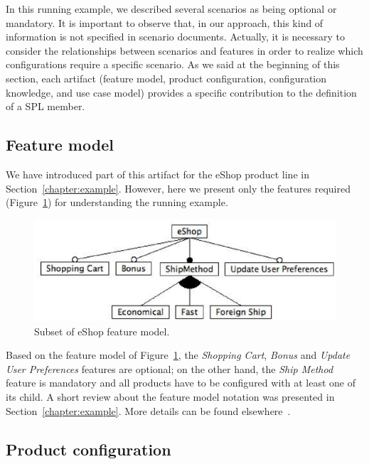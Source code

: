 \documentclass[11pt]{report}
\begin{document}
In this running example, we described several scenarios as being optional or
mandatory. It is important to observe that, in our approach, this kind of
information is not specified in scenario documents. Actually, it is necessary to
consider the relationships between scenarios and features in order to realize
which configurations require a specific scenario. As we said at the beginning of
this section, each artifact (feature model, product configuration, configuration
knowledge, and use case model) provides a specific contribution to the definition
of a SPL member.

\subsection{Feature model}\label{subsub:fm}

We have introduced part of this artifact for the eShop product line in
Section~\ref{chapter:example}. However, here we present only the features required 
(Figure~\ref{fig:eshop-fm-re}) for understanding the running example.

 \begin{figure}[h]
 \begin{center}
  \includegraphics[scale=0.40]{img/eShop-fm-re.eps}
    \caption{Subset of eShop feature model.}
  \label{fig:eshop-fm-re}
  \end{center}
\end{figure}

Based on the feature model of Figure~\ref{fig:eshop-fm-re}, the \emph{Shopping
Cart}, \emph{Bonus} and \emph{Update User Preferences} features are optional;
on the other hand, the \emph{Ship Method} feature is mandatory and all products
have to be configured with at least one of its child. A short review about the
feature model notation was presented in Section~\ref{chapter:example}. More details
can be found elsewhere~\cite{gheyi-alloy-06,czarnecki-book}.

\subsection{Product configuration}\label{subsub:pc}
\end{document}
